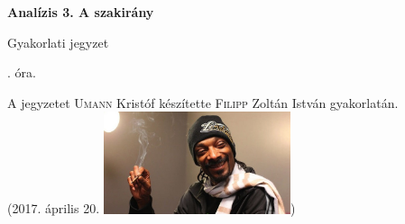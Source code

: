 \documentclass[a4paper,11.5pt]{article}
\begin{document}
	\setlength\parindent{0pt}
	\def\a{\textbf{a}}
	\def\b{\textbf{b}}
	\def\N{\hskip 10 true mm}
	\def\a{\textbf{a}}
	\def\b{\textbf{b}}
	\def\c{\textbf{c}}
	\def\d{\textbf{d}}
	\def\e{\textbf{e}}
	\def\gg{$\gamma$}
	\def\vi{\textbf{i}}
	\def\jj{\textbf{j}}
	\def\kk{\textbf{k}}
	\def\fh{\overrightarrow}
	\def\l{\lambda}
	\def\m{\mu}
	\def\v{\textbf{v}}
	\def\0{\textbf{0}}
	\def\s{\hspace{0.2mm}\vphantom{\beta}}
	\def\Z{\mathbb{Z}}
	\def\Q{\mathbb{Q}}
	\def\R{\mathbb{R}}
	\def\C{\mathbb{C}}
	\def\N{\mathbb{N}}
	\def\Rn{\mathbb{R}^{n}}
	\def\Ra{\overline{\mathbb{R}}}
	\def\sume{\displaystyle\sum_{n=1}^{+\infty}}
	\def\sumn{\displaystyle\sum_{n=0}^{+\infty}}
	\def\biz{\emph{Bizonyítás:\ }}
	\def\narrow{\underset{n\rightarrow+\infty}{\longrightarrow}}
	\def\limn{\displaystyle\lim_{n\to +\infty}}
	
	\theoremstyle{definition}
	\newtheorem{theorem}{Tétel}[subsubsection] %
	
	\theoremstyle{definition}
	\newtheorem{definition}[theorem]{Definíció} %
	\newtheorem{example}[theorem]{Példa} %
	\newtheorem{exercise}[theorem]{Házi feladat} %
	\newtheorem{note}[theorem]{Megjegyzés} %
	\newtheorem{task}[theorem]{Feladat} %
	\newtheorem{revision}[theorem]{Emlékeztető} %
	\begin{center}
		{\LARGE\textbf{Analízis 3. A szakirány}}
		\smallskip
		
		{\Large Gyakorlati jegyzet}
		
		. óra.
	\end{center}
	A jegyzetet \textsc{Umann} Kristóf készítette \textsc{Filipp} Zoltán István gyakorlatán.\\ (2017. április 20.
	\includegraphics[height=3cm]{kepek/420.jpg}) %
\end{document}
